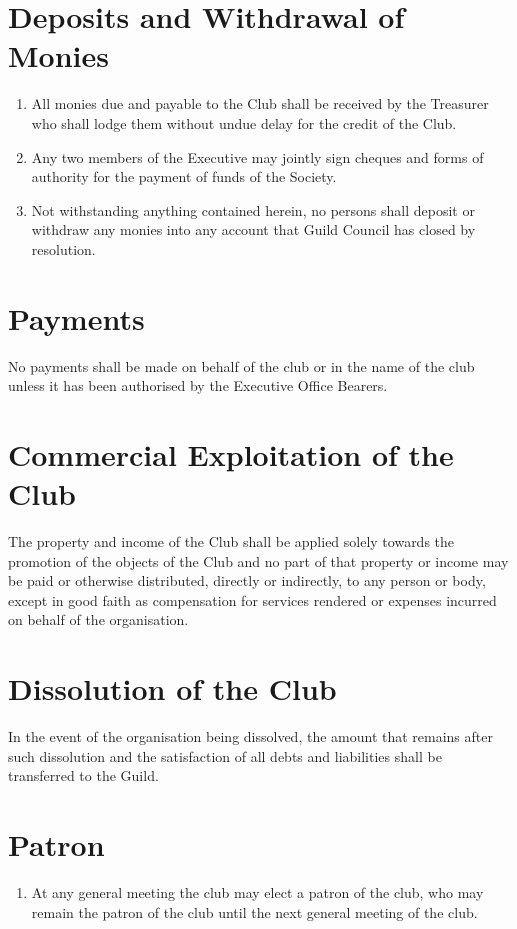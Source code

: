 \documentclass[10pt,a4paper]{report}
\begin{document}
	    \section{Deposits and Withdrawal of Monies}
			\begin{enumerate}[label=\arabic*]
				\item All monies due and payable to the Club shall be received by the Treasurer who shall lodge them without undue delay for the credit of the Club.
				\item Any two members of the Executive may jointly sign cheques and forms of authority for the payment of funds of the Society.
				\item Not withstanding anything contained herein, no persons shall deposit or withdraw any monies into any account that Guild Council has closed by resolution.
			\end{enumerate}
		
		\section{Payments}
			No payments shall be made on behalf of the club or in the name of the club unless it has been authorised by the Executive Office Bearers.
		
		\section{Commercial Exploitation of the Club}
			The property and income of the Club shall be applied solely towards the promotion of the objects of the Club and no part of that property or income may be paid or otherwise distributed, directly or indirectly, to any person or body, except in good faith as compensation for services rendered or expenses incurred on behalf of the organisation.

		\section{Dissolution of the Club}
			In the event of the organisation being dissolved, the amount that remains after such dissolution and the satisfaction of all debts and liabilities shall be transferred to the Guild.
		
		\section{Patron}
		    \begin{enumerate}[label=\arabic*]
			  \item At any general meeting the club may elect a patron of the club, who may remain the patron of the club until the next general meeting of the club. \\
			\end{enumerate}
\end{document}
